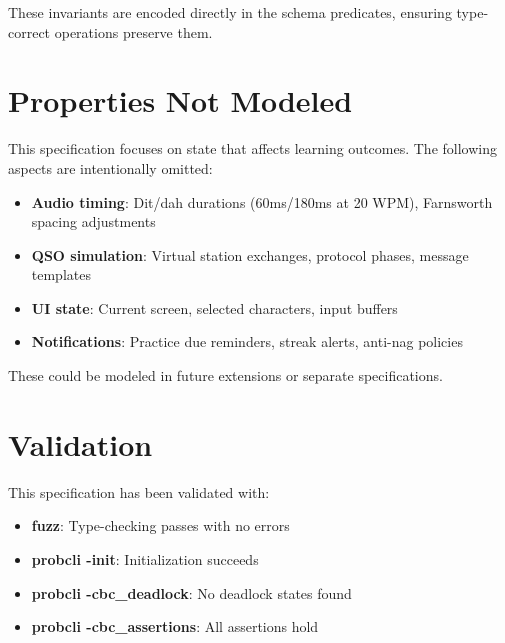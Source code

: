 \documentclass[a4paper,10pt,fleqn]{article}
\begin{document}
These invariants are encoded directly in the schema predicates, ensuring
type-correct operations preserve them.

\section{Properties Not Modeled}

This specification focuses on state that affects learning outcomes. The following
aspects are intentionally omitted:

\begin{itemize}
\item \textbf{Audio timing}: Dit/dah durations (60ms/180ms at 20 WPM),
      Farnsworth spacing adjustments

\item \textbf{QSO simulation}: Virtual station exchanges, protocol phases,
      message templates

\item \textbf{UI state}: Current screen, selected characters, input buffers

\item \textbf{Notifications}: Practice due reminders, streak alerts,
      anti-nag policies
\end{itemize}

These could be modeled in future extensions or separate specifications.

\section{Validation}

This specification has been validated with:

\begin{itemize}
\item \textbf{fuzz}: Type-checking passes with no errors
\item \textbf{probcli -init}: Initialization succeeds
\item \textbf{probcli -cbc\_deadlock}: No deadlock states found
\item \textbf{probcli -cbc\_assertions}: All assertions hold
\end{itemize}
\end{document}
